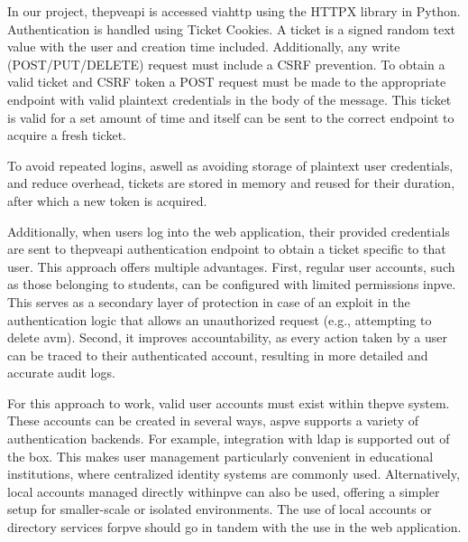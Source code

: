     In our project, the\ac{pve}\ac{api} is accessed via\ac{http} using the HTTPX library in Python. 
    Authentication is handled using Ticket Cookies. A ticket is a signed random text value with the user and creation 
    time included. Additionally, any write (POST/PUT/DELETE) request must include a CSRF prevention. To obtain a valid 
    ticket and CSRF token a POST request must be made to the appropriate endpoint with valid plaintext credentials in the 
    body of the message. This ticket is valid for a set amount of time and itself can be sent to the correct endpoint to 
    acquire a fresh ticket.

    To avoid repeated logins, aswell as avoiding storage of plaintext user credentials, and reduce overhead, tickets are 
    stored in memory and reused for their duration, after which a new token is acquired.

    Additionally, when users log into the web application, their provided credentials are sent to the\ac{pve}\ac{api} 
    authentication endpoint to obtain a ticket specific to that user. This approach offers multiple advantages. 
    First, regular user accounts, such as those belonging to students, can be configured with limited permissions in\ac{pve}. 
    This serves as a secondary layer of protection in case of an exploit in the authentication logic that allows an unauthorized 
    request (e.g., attempting to delete a\ac{vm}). Second, it improves accountability, as every action taken by a user 
    can be traced to their authenticated account, resulting in more detailed and accurate audit logs.

    For this approach to work, valid user accounts must exist within the\ac{pve} system. These accounts can be created in 
    several ways, as\ac{pve} supports a variety of authentication backends. For example, integration with \ac{ldap} is 
    supported out of the box. This makes user management particularly convenient in educational institutions, where 
    centralized identity systems are commonly used. Alternatively, local accounts managed directly within\ac{pve} 
    can also be used, offering a simpler setup for smaller-scale or isolated environments. The use of local accounts 
    or directory services for\ac{pve} should go in tandem with the use in the web application.


